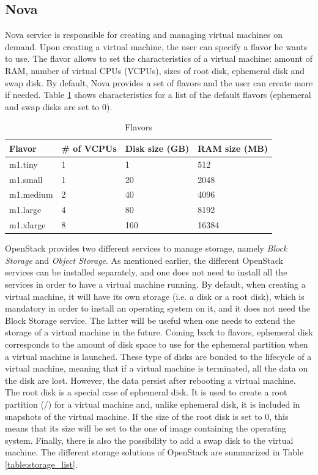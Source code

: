 \subsection{Nova}
Nova service is responsible for creating and managing virtual machines on demand.
Upon creating a virtual machine, the user can specify a flavor he wants to use.
The flavor allows to set the characteristics of a virtual machine: amount of RAM, number of virtual CPUs (VCPUs), sizes of root disk, ephemeral disk and swap disk. By default, Nova provides a set of flavors and the user can create more if needed.
Table \ref{table:flavors_list} shows characteristics for a list of the default flavors (ephemeral and swap disks are set to 0).

\begin{table}[h]
	\centering
	\begin{tabular}{|l|l|l|l|}
		\hline
		\textbf{Flavor} & \textbf{\# of VCPUs} & \textbf{Disk size (GB)} & \textbf{RAM size (MB)}\\
		\hline
		m1.tiny & 1 & 1 & 512 \\
		m1.small & 1 & 20 & 2048 \\
		m1.medium & 2 & 40 & 4096 \\
		m1.large & 4 & 80 & 8192 \\
		m1.xlarge & 8 & 160 & 16384 \\
		\hline
	\end{tabular}
	\caption{Flavors}
	\label{table:flavors_list}
\end{table}

OpenStack provides two different services to manage storage, namely \textit{Block Storage} and \textit{Object Storage}.
As mentioned earlier, the different OpenStack services can be installed separately, and one does not need to install all the services in order to have a virtual machine running.
By default, when creating a virtual machine, it will have its own storage (i.e. a disk or a root disk), which is mandatory in order to install an operating system on it,
and it does not need the Block Storage service. 
The latter will be useful when one needs to extend the storage of a virtual machine in the future. 
Coming back to flavors, ephemeral disk corresponds to the amount of disk space to use for the ephemeral partition when a virtual machine is launched. 
These type of disks are bonded to the lifecycle of a virtual machine, meaning that if a virtual machine is terminated, all the data on the disk are lost. 
However, the data persist after rebooting a virtual machine. 
The root disk is a special case of ephemeral disk. 
It is used to create a root partition (/) for a virtual machine and, unlike ephemeral disk, it is included in snapshots of the virtual machine. 
If the size of the root disk is set to 0, this means that its size will be set to the one of image containing the operating system.
Finally, there is also the possibility to add a swap disk to the virtual machine.
The different storage solutions of OpenStack are summarized in Table \ref{table:storage_list}.

